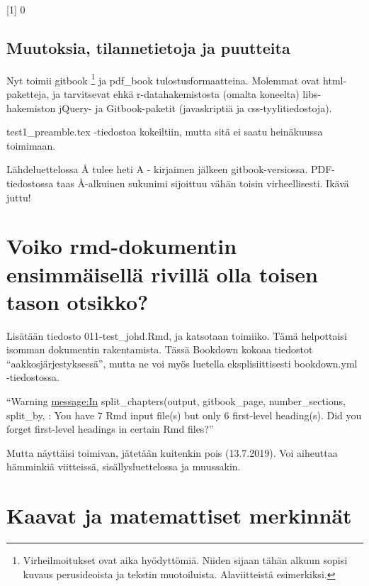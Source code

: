\documentclass[
  finnish,
]{book}
\begin{document}
{[}1{]} 0

\hypertarget{muutoksia-tilannetietoja-ja-puutteita}{%
\section{Muutoksia, tilannetietoja ja puutteita}\label{muutoksia-tilannetietoja-ja-puutteita}}

Nyt toimii gitbook \footnote{Virheilmoitukset ovat aika hyödyttömiä. Niiden sijaan tähän alkuun sopisi kuvaus perusideoista ja tekstin muotoiluista. Alaviitteistä esimerkiksi.} ja pdf\_book tulostusformaatteina. Molemmat ovat html-paketteja, ja tarvitsevat ehkä r-datahakemistosta (omalta koneelta) libs-hakemiston jQuery- ja Gitbook-paketit (javaskriptiä ja css-tyylitiedostoja).

test1\_preamble.tex -tiedostoa kokeiltiin, mutta sitä ei saatu heinäkuussa toimimaan.

Lähdeluettelossa Å tulee heti A - kirjaimen jälkeen gitbook-versiossa. PDF-tiedostossa taas Å-alkuinen sukunimi sijoittuu vähän toisin virheellisesti. Ikävä juttu!

\hypertarget{voiko-rmd-dokumentin-ensimmuxe4iselluxe4-rivilluxe4-olla-toisen-tason-otsikko}{%
\chapter{Voiko rmd-dokumentin ensimmäisellä rivillä olla toisen tason otsikko?}\label{voiko-rmd-dokumentin-ensimmuxe4iselluxe4-rivilluxe4-olla-toisen-tason-otsikko}}

Lisätään tiedosto 011-test\_johd.Rmd, ja katsotaan toimiiko. Tämä helpottaisi
isomman dokumentin rakentamista. Tässä Bookdown kokoaa tiedostot ``aakkosjärjestyksessä'',
mutta ne voi myös luetella eksplisiittisesti bookdown.yml -tiedostossa.

``Warning \url{message:In} split\_chapters(output, gitbook\_page, number\_sections, split\_by, :
You have 7 Rmd input file(s) but only 6 first-level heading(s). Did you forget first-level headings in certain Rmd files?''

Mutta näyttäisi toimivan, jätetään kuitenkin pois (13.7.2019). Voi aiheuttaa hämminkiä viitteissä, sisällysluettelossa ja muussakin.

\hypertarget{kaavat-ja-matemattiset-merkinnuxe4t}{%
\chapter{Kaavat ja matemattiset merkinnät}\label{kaavat-ja-matemattiset-merkinnuxe4t}}
\end{document}
